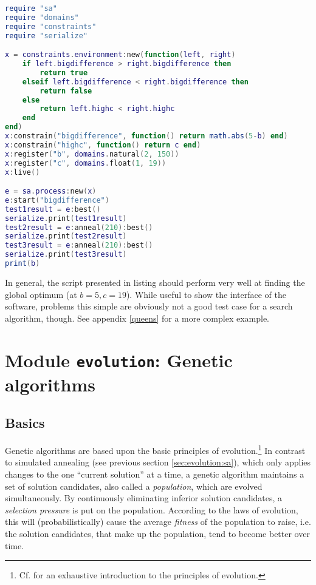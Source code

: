 \begin{lstlisting}[language=lua, caption={Solving (and reiterating) the constraints of listing \ref{lst:constraints1}.}, label=lst:sa, name=lst:sa]
require "sa"
require "domains"
require "constraints"
require "serialize"

x = constraints.environment:new(function(left, right)
	if left.bigdifference > right.bigdifference then
		return true
	elseif left.bigdifference < right.bigdifference then
		return false
	else
		return left.highc < right.highc
	end
end)
x:constrain("bigdifference", function() return math.abs(5-b) end)
x:constrain("highc", function() return c end)
x:register("b", domains.natural(2, 150))
x:register("c", domains.float(1, 19))
x:live()

e = sa.process:new(x)
e:start("bigdifference")
test1result = e:best()
serialize.print(test1result)
test2result = e:anneal(210):best()
serialize.print(test2result)
test3result = e:anneal(210):best()
serialize.print(test3result)
print(b)
\end{lstlisting}

In general, the script presented in listing should perform very well at finding the global optimum (at $b=5, c=19$). While useful to show the interface of the software, problems this simple are obviously not a good test case for a search algorithm, though. See appendix \ref{queens} for a more complex example.

\section{Module \texttt{evolution}: Genetic algorithms}
\label{sec:evolution:evolution}

\subsection{Basics}
\label{sec:evolution:basics}

Genetic algorithms are based upon the basic principles of evolution.\footnote{Cf. \cite{Dawkins1990} for an exhaustive introduction to the principles of evolution.} In contrast to simulated annealing (see previous section \ref{sec:evolution:sa}), which only applies changes to the one ``current solution'' at a time, a genetic algorithm maintains a set of solution candidates, also called a \emph{population}, which are evolved simultaneously. By continuously eliminating inferior solution candidates, a \emph{selection pressure} is put on the population. According to the laws of evolution, this will (probabilistically) cause the average \emph{fitness} of the population to raise, i.e. the solution candidates, that make up the population, tend to become better over time.

